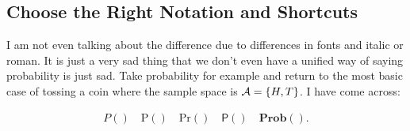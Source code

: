 \documentclass[aos,preprint]{imsart}
\begin{document}
\subsection{Choose the Right Notation and Shortcuts}

I am not even talking about the difference due to differences in fonts and italic or roman.
It is just a very sad thing that we don't even have a unified way of saying probability is just sad.
Take probability for example and return to the most basic case of tossing a
coin 
where the sample space is $\mathcal{A} = \{H, T\}$. I have come across:

\begin{align*}
    P() \quad \mathrm{P}() \quad \mathrm{Pr}() \quad \mathsf{P}() \quad
\mathbf{Prob}().
\end{align*}
\end{document}
